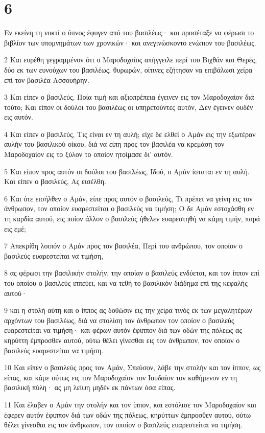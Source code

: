 \chapter{6}

\par Εν εκείνη τη νυκτί ο ύπνος έφυγεν από του βασιλέως· και προσέταξε να φέρωσι το βιβλίον των υπομνημάτων των χρονικών· και ανεγινώσκοντο ενώπιον του βασιλέως.
\par 2 Και ευρέθη γεγραμμένον ότι ο Μαροδοχαίος απήγγειλε περί του Βιχθάν και Θερές, δύο εκ των ευνούχων του βασιλέως, θυρωρών, οίτινες εζήτησαν να επιβάλωσι χείρα επί τον βασιλέα Ασσουήρην.
\par 3 Και είπεν ο βασιλεύς, Ποία τιμή και αξιοπρέπεια έγεινεν εις τον Μαροδοχαίον διά τούτο; Και είπον οι δούλοι του βασιλέως οι υπηρετούντες αυτόν, Δεν έγεινεν ουδέν εις αυτόν.
\par 4 Και είπεν ο βασιλεύς, Τις είναι εν τη αυλή; είχε δε ελθεί ο Αμάν εις την εξωτέραν αυλήν του βασιλικού οίκου, διά να είπη προς τον βασιλέα να κρεμάση τον Μαροδοχαίον εις το ξύλον το οποίον ητοίμασε δι' αυτόν.
\par 5 Και είπον προς αυτόν οι δούλοι του βασιλέως, Ιδού, ο Αμάν ίσταται εν τη αυλή. Και είπεν ο βασιλεύς, Ας εισέλθη.
\par 6 Και ότε εισήλθεν ο Αμάν, είπε προς αυτόν ο βασιλεύς, Τι πρέπει να γείνη εις τον άνθρωπον, τον οποίον ευαρεστείται ο βασιλεύς να τιμήση; Ο δε Αμάν εστοχάσθη εν τη καρδία αυτού, εις ποίον άλλον ο βασιλεύς ήθελεν ευαρεστηθή να κάμη τιμήν, παρά εις εμέ;
\par 7 Απεκρίθη λοιπόν ο Αμάν προς τον βασιλέα, Περί του ανθρώπου, τον οποίον ο βασιλεύς ευαρεστείται να τιμήση,
\par 8 ας φέρωσι την βασιλικήν στολήν, την οποίαν ο βασιλεύς ενδύεται, και τον ίππον επί του οποίου ο βασιλεύς ιππεύει, και να τεθή το βασιλικόν διάδημα επί της κεφαλής αυτού·
\par 9 και η στολή αύτη και ο ίππος ας δοθώσιν εις την χείρα τινός εκ των μεγαλητέρων αρχόντων του βασιλέως, διά να στολίση τον άνθρωπον τον οποίον ο βασιλεύς ευαρεστείται να τιμήση· και φέρων αυτόν έφιππον διά των οδών της πόλεως ας κηρύττη έμπροσθεν αυτού, ούτω θέλει γίνεσθαι εις τον άνθρωπον, τον οποίον ο βασιλεύς ευαρεστείται να τιμήση.
\par 10 Και είπεν ο βασιλεύς προς τον Αμάν, Σπεύσον, λάβε την στολήν και τον ίππον, ως είπας, και κάμε ούτως εις τον Μαροδοχαίον τον Ιουδαίον τον καθήμενον εν τη βασιλική πύλη· ας μη λείψη μηδέν εκ πάντων όσα είπας.
\par 11 Και έλαβεν ο Αμάν την στολήν και τον ίππον, και εστόλισε τον Μαροδοχαίον και έφερεν αυτόν έφιππον διά των οδών της πόλεως, κηρύττων έμπροσθεν αυτού, ούτω θέλει γίνεσθαι εις τον άνθρωπον, τον οποίον ο βασιλεύς ευαρεστείται να τιμήση.
